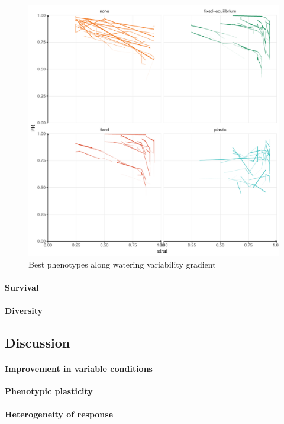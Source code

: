 \begin{figure}\label{fig:variable_trajectories}
\includegraphics[width = \textwidth]{./2_PP/Figures/Variable/var_2D_strat_dyn.pdf}
\caption{Best phenotypes along watering variability gradient}
\end{figure}

\paragraph{Survival}

\paragraph{Diversity}



\subsection{Discussion}

\paragraph{Improvement in variable conditions}

\textbf{Phenotypic plasticity }

\paragraph{Heterogeneity of response}

